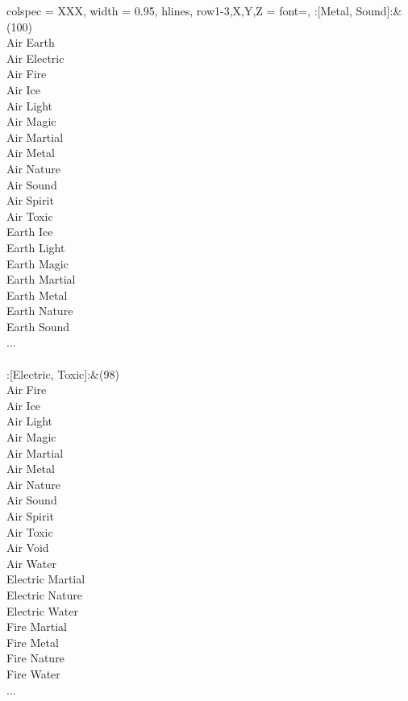 \begin{longtblr}[
	caption = {2v2 Attacking Effective},
	label = {2v2-Attacking-Effective},
]{
	colspec = {XXX}, width = 0.95\linewidth,
	hlines,
	row{1-3,X,Y,Z} = {font=\bfseries},
}
	:[Metal, Sound]:&{(100)\\
	Air Earth \\
	Air Electric \\
	Air Fire \\
	Air Ice \\
	Air Light \\
	Air Magic \\
	Air Martial \\
	Air Metal \\
	Air Nature \\
	Air Sound \\
	Air Spirit \\
	Air Toxic \\
	Earth Ice \\
	Earth Light \\
	Earth Magic \\
	Earth Martial \\
	Earth Metal \\
	Earth Nature \\
	Earth Sound \\
	...\\
	}\\

	:[Electric, Toxic]:&{(98)\\
	Air Fire \\
	Air Ice \\
	Air Light \\
	Air Magic \\
	Air Martial \\
	Air Metal \\
	Air Nature \\
	Air Sound \\
	Air Spirit \\
	Air Toxic \\
	Air Void \\
	Air Water \\
	Electric Martial \\
	Electric Nature \\
	Electric Water \\
	Fire Martial \\
	Fire Metal \\
	Fire Nature \\
	Fire Water \\
	...\\
	}\\


\end{longtblr}
